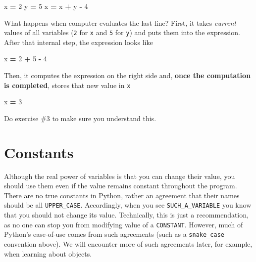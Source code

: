 \documentclass[
]{book}
\newenvironment{Shaded}{\begin{snugshade}}{\end{snugshade}}
\newcommand{\DecValTok}[1]{\textcolor[rgb]{0.00,0.00,0.81}{#1}}
\newcommand{\NormalTok}[1]{#1}
\newcommand{\OperatorTok}[1]{\textcolor[rgb]{0.81,0.36,0.00}{\textbf{#1}}}
\begin{document}
\begin{Shaded}
\begin{Highlighting}[]
\NormalTok{x }\OperatorTok{=} \DecValTok{2}
\NormalTok{y }\OperatorTok{=} \DecValTok{5}
\NormalTok{x }\OperatorTok{=}\NormalTok{ x }\OperatorTok{+}\NormalTok{ y }\OperatorTok{{-}} \DecValTok{4}
\end{Highlighting}
\end{Shaded}

What happens when computer evaluates the last line? First, it takes \emph{current} values of all variables (\texttt{2} for \texttt{x} and \texttt{5} for \texttt{y}) and puts them into the expression. After that internal step, the expression looks like

\begin{Shaded}
\begin{Highlighting}[]
\NormalTok{x }\OperatorTok{=} \DecValTok{2} \OperatorTok{+} \DecValTok{5} \OperatorTok{{-}} \DecValTok{4}
\end{Highlighting}
\end{Shaded}

Then, it computes the expression on the right side and, \textbf{once the computation is completed}, stores that new value in \texttt{x}

\begin{Shaded}
\begin{Highlighting}[]
\NormalTok{x }\OperatorTok{=} \DecValTok{3}
\end{Highlighting}
\end{Shaded}

Do exercise \#3 to make sure you understand this.

\hypertarget{constants}{%
\section{Constants}\label{constants}}

Although the real power of variables is that you can change their value, you should use them even if the value remains constant throughout the program. There are no true constants in Python, rather an agreement that their names should be all \texttt{UPPER\_CASE}. Accordingly, when you see \texttt{SUCH\_A\_VARIABLE} you know that you should not change its value. Technically, this is just a recommendation, as no one can stop you from modifying value of a \texttt{CONSTANT}. However, much of Python's ease-of-use comes from such agreements (such as a \texttt{snake\_case} convention above). We will encounter more of such agreements later, for example, when learning about objects.
\end{document}

